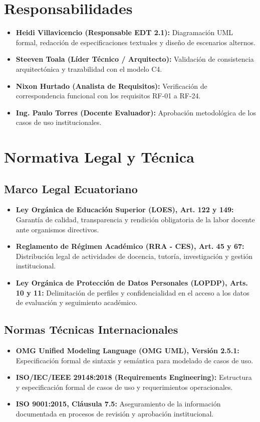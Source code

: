 \documentclass[12pt,a4paper]{article}
\begin{document}
\section{Responsabilidades}
\begin{itemize}[leftmargin=1.5em, itemsep=2pt]
    \item \textbf{Heidi Villavicencio (Responsable EDT 2.1):} Diagramación UML formal, redacción de especificaciones textuales y diseño de escenarios alternos.
    \item \textbf{Steeven Toala (Líder Técnico / Arquitecto):} Validación de consistencia arquitectónica y trazabilidad con el modelo C4.
    \item \textbf{Nixon Hurtado (Analista de Requisitos):} Verificación de correspondencia funcional con los requisitos RF-01 a RF-24.
    \item \textbf{Ing. Paulo Torres (Docente Evaluador):} Aprobación metodológica de los casos de uso institucionales.
\end{itemize}

\section{Normativa Legal y Técnica}
\subsection{Marco Legal Ecuatoriano}
\begin{itemize}[leftmargin=1.5em, itemsep=2pt]
    \item \textbf{Ley Orgánica de Educación Superior (LOES), Art. 122 y 149:} Garantía de calidad, transparencia y rendición obligatoria de la labor docente ante organismos directivos.
    \item \textbf{Reglamento de Régimen Académico (RRA - CES), Art. 45 y 67:} Distribución legal de actividades de docencia, tutoría, investigación y gestión institucional.
    \item \textbf{Ley Orgánica de Protección de Datos Personales (LOPDP), Arts. 10 y 11:} Delimitación de perfiles y confidencialidad en el acceso a los datos de evaluación y seguimiento académico.
\end{itemize}
\subsection{Normas Técnicas Internacionales}
\begin{itemize}[leftmargin=1.5em, itemsep=2pt]
    \item \textbf{OMG Unified Modeling Language (OMG UML), Versión 2.5.1:} Especificación formal de sintaxis y semántica para modelado de casos de uso.
    \item \textbf{ISO/IEC/IEEE 29148:2018 (Requirements Engineering):} Estructura y especificación formal de casos de uso y requerimientos operacionales.
    \item \textbf{ISO 9001:2015, Cláusula 7.5:} Aseguramiento de la información documentada en procesos de revisión y aprobación institucional.
\end{itemize}
\end{document}
